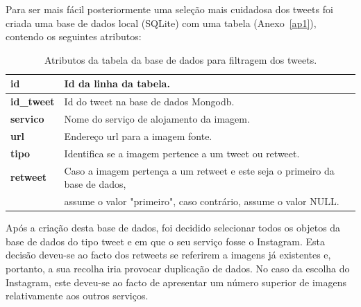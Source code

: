 Para ser mais fácil posteriormente uma seleção mais cuidadosa dos tweets foi criada uma base de dados local (SQLite) com uma tabela (Anexo~\ref{ap1}), contendo os seguintes atributos:

\begin{table}[h]
\centering
\begin{tabular}{|l|l|}
\hline
\textbf{id}        & Id da linha da tabela.                                 \\ \hline
\textbf{id\_tweet} & Id do tweet na base de dados Mongodb.                  \\ \hline
\textbf{servico}   & Nome do serviço de alojamento da imagem.               \\ \hline
\textbf{url}       & Endereço url para a imagem fonte.                      \\ \hline
\textbf{tipo}      & Identifica se a imagem pertence a um tweet ou retweet. \\ \hline
\textbf{retweet}   & Caso a imagem pertença a um retweet e este seja o primeiro da base de dados, \\ & assume o valor "primeiro", caso contrário, assume o valor NULL.                     \\ \hline
\end{tabular}
\caption{Atributos da tabela da base de dados para filtragem dos tweets.}
\end{table}



Após a criação desta base de dados, foi decidido selecionar todos os objetos da base de dados do tipo tweet e em que o seu serviço fosse o Instagram. Esta decisão deveu-se ao facto dos retweets se referirem a imagens já existentes e, portanto, a sua recolha iria provocar duplicação de dados. No caso da escolha do Instagram, este deveu-se ao facto de apresentar um número superior de imagens relativamente aos outros serviços.

